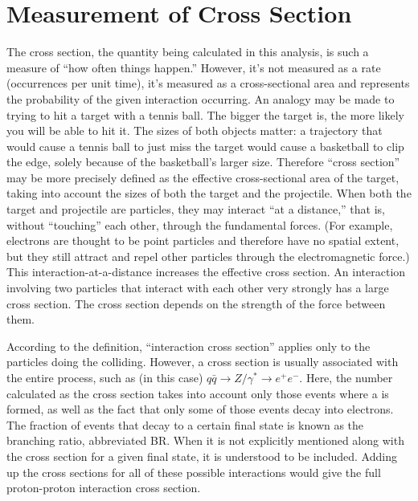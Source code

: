 \section{Measurement of Cross Section}
\label{over:xsec}

The cross section, the quantity being calculated in this analysis, 
is such a measure of ``how often things happen.''  %
However, it's not measured as a rate (occurrences per unit time), 
it's measured as a cross-sectional area 
and represents the probability of the given interaction occurring.  
An analogy may be made to trying to hit a target with a tennis ball.  
The bigger the target is, the more likely you will be able to hit it.  
The sizes of both objects matter: 
a trajectory that would cause a tennis ball to just miss the target 
would cause a basketball to clip the edge, 
solely because of the basketball's larger size.  
Therefore ``cross section'' may be more precisely defined as the 
effective cross-sectional area of the target, 
taking into account the sizes of both the target and the projectile.  
When both the target and projectile are particles, %
they may interact ``at a distance,'' that is, without ``touching'' each other, 
through the fundamental forces.  
(For example, electrons are thought to be point particles 
and therefore have no spatial extent, 
but they still attract and repel other particles 
through the electromagnetic force.) 
This interaction-at-a-distance increases the effective cross section.  
An interaction involving two particles that 
interact with each other very strongly has a large cross section.  
The cross section depends on the strength of the force between them.  

According to the definition, ``interaction cross section'' applies only to 
the particles doing the colliding.  
However, a cross section is usually associated with the entire process, 
such as (in this case) 
$ q\bar{q} \rightarrow Z/ \gamma^{*} \rightarrow e^{+} e^{-} $.  %
Here, the number calculated as the cross section takes into account 
only those events where a \Zg is formed, 
as well as the fact that only some of those events decay into electrons.  
The fraction of events that decay to a certain final state is known as 
the branching ratio, abbreviated BR.  
When it is not explicitly mentioned along with the cross section 
for a given final state, it is understood to be included.  
Adding up the cross sections for all of these possible interactions 
would give the full proton-proton interaction cross section.  

